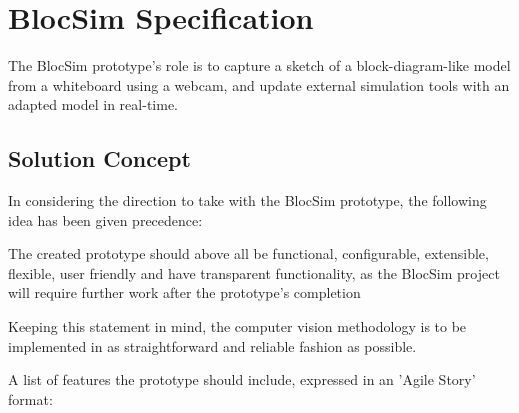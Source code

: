 






\chapter{BlocSim Specification}
\label{ch:spec}

The BlocSim prototype's role is to capture a sketch of a block-diagram-like model from a whiteboard using a webcam, and update external simulation tools with an adapted model in real-time. 

\section{Solution Concept}

In considering the direction to take with the BlocSim prototype, the following idea has been given precedence: 
\\

\setlength{\leftskip}{1cm}

\noindent The created prototype should above all be functional, configurable, extensible, flexible, user friendly and have transparent functionality, as the BlocSim project will require further work after the prototype's completion
\\

\setlength{\leftskip}{0cm}


\noindent Keeping this statement in mind, the computer vision methodology is to be implemented in as straightforward and reliable fashion as possible.

A list of features the prototype should include, expressed in an 'Agile Story' format:

